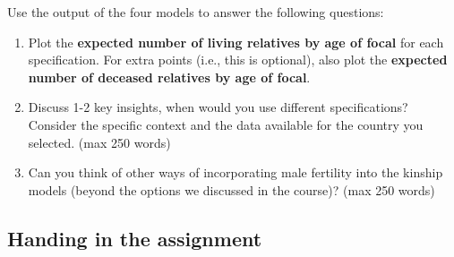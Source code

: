 ﻿\documentclass{article}
\begin{document}
    Use the output of the four models to answer the following questions:

    \begin{enumerate}
     
    \item Plot the \textbf{expected number of living relatives by age of focal} for each specification. For extra points (i.e., this is optional), also plot the \textbf{expected number of deceased relatives by age of focal}.
    \item Discuss 1-2 key insights, when would you use different specifications? Consider the specific context and the data available for the country you selected. (max 250 words)
    \item Can you think of other ways of incorporating male fertility into the kinship models (beyond the options we discussed in the course)?  (max 250 words)
       \end{enumerate}  




\subsection{Handing in the assignment}
\end{document}
